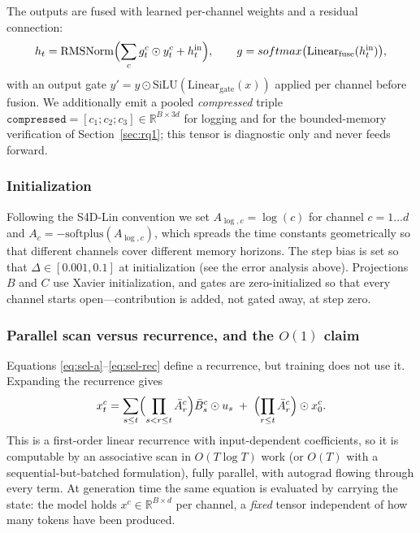 \documentclass[11pt,a4paper]{article}
\newcommand{\Atr}{\bar{A}}
\newcommand{\Btr}{\bar{B}}
\newcommand{\Rt}{\mathrm{RMSNorm}}
\newcommand{\sm}{softmax}
\theoremstyle{plain}
\theoremstyle{definition}
\theoremstyle{remark}
\begin{document}
\noindent
The outputs are fused with learned per-channel weights and
a residual connection:
\begin{equation}
  h_t = \Rt\Bigl( \sum_{c} g^c_t \odot y^c_t + h^{\mathrm{in}}_t \Bigr),
  \qquad g = \sm\bigl(\mathrm{Linear}_{\mathrm{fuse}}(h^{\mathrm{in}}_t)\bigr),
  \label{eq:l1-fusion}
\end{equation}
with an output gate $y' = y \odot \mathrm{SiLU}(\mathrm{Linear}_{\mathrm{gate}}(x))$
applied per channel before fusion. We additionally emit a pooled
\emph{compressed} triple $\texttt{compressed} = [c_1; c_2; c_3] \in \mathbb{R}^{B \times 3d}$
for logging and for the bounded-memory verification of
Section~\ref{sec:rq1}; this tensor is diagnostic only and never feeds
forward.

\subsubsection{Initialization}

\noindent
Following the S4D-Lin convention \cite{gu2022s4d} we set
$A_{\log,c} = \log(c)$ for channel $c = 1 \dots d$ and
$A_c = -\mathrm{softplus}(A_{\log,c})$, which spreads the time constants
geometrically so that different channels cover different memory horizons. The
step bias is set so that $\Delta \in [0.001, 0.1]$ at initialization (see the
error analysis above). Projections $B$ and $C$ use Xavier initialization, and
gates are zero-initialized so that every channel starts open---contribution
is added, not gated away, at step zero.

\subsubsection{Parallel scan versus recurrence, and the \texorpdfstring{$O(1)$}{O(1)} claim}

\noindent
Equations \eqref{eq:sel-a}--\eqref{eq:sel-rec} define a recurrence, but
training does not use it. Expanding the recurrence gives
\begin{equation}
  x^c_t = \sum_{s \le t} \Bigl(\prod_{s < r \le t} \Atr^c_r\Bigr) \Btr^c_s \odot u_s
  \; + \; \Bigl(\prod_{r \le t} \Atr^c_r\Bigr) \odot x^c_0 .
  \label{eq:scan-expansion}
\end{equation}
This is a first-order linear recurrence with input-dependent coefficients, so
it is computable by an associative scan in $O(T \log T)$ work (or $O(T)$ with a
sequential-but-batched formulation), fully parallel, with autograd flowing
through every term. At generation time the same equation is evaluated by
carrying the state: the model holds $x^c \in \mathbb{R}^{B \times d}$ per
channel, a \emph{fixed} tensor independent of how many tokens have been
produced.
\end{document}
